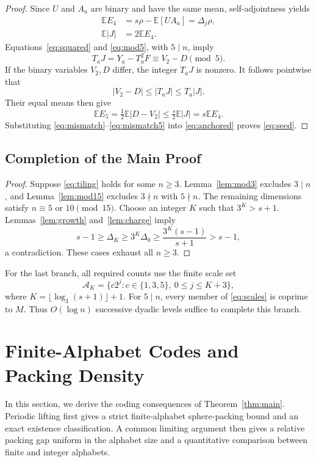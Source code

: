 \documentclass[12pt,letterpaper,onecolumn]{article}
\theoremstyle{definition}
\newcommand{\E}{\mathbb{E}}
\begin{document}
\begin{proof}
Since $U$ and $A_a$ are binary and have the same mean, self-adjointness yields
\begin{align}\label{eq:mismatch}
 \E E_4&=s\rho-\E[UA_a]=\Delta_j\rho,\nonumber\\
 \E|J|&=2\E E_4.
\end{align}
Equations~\eqref{eq:squared} and \eqref{eq:mod5}, with $5\mid n$, imply
\[
 T_aJ=Y_a-T_a^2F\equiv V_2-D\pmod5.
\]
If the binary variables $V_2,D$ differ, the integer $T_aJ$ is nonzero. It follows pointwise that
\[
 |V_2-D|\le|T_aJ|\le T_a|J|.
\]
Their equal means then give
\begin{equation}\label{eq:mismatch5}
 \E E_5=\tfrac12\E|D-V_2|
 \le\tfrac{s}{2}\E|J|=s\E E_4.
\end{equation}
Substituting \eqref{eq:mismatch}--\eqref{eq:mismatch5} into \eqref{eq:anchored} proves \eqref{eq:seed}.
\end{proof}

\subsection{Completion of the Main Proof}
\begin{proof}
Suppose \eqref{eq:tiling} holds for some $n\ge3$. Lemma~\ref{lem:mod3} excludes $3\mid n$, and Lemma~\ref{lem:mod15} excludes $3\nmid n$ with $5\nmid n$. The remaining dimensions satisfy $n\equiv5$ or $10\pmod{15}$. Choose an integer $K$ such that $3^K>s+1$. Lemmas~\ref{lem:growth} and~\ref{lem:charge} imply
\begin{equation}\label{eq:final-contradiction}
 s-1\ge\Delta_K\ge3^K\Delta_0
 \ge\frac{3^K(s-1)}{s+1}>s-1,
\end{equation}
a contradiction. These cases exhaust all $n\ge3$.
\end{proof}

For the last branch, all required counts use the finite scale set
\begin{equation}\label{eq:scales}
 \mathcal A_K=\{c2^j:c\in\{1,3,5\},\ 0\le j\le K+3\},
\end{equation}
where $K=\lfloor\log_3(s+1)\rfloor+1$. For $5\mid n$, every member of \eqref{eq:scales} is coprime to $M$. Thus $O(\log n)$ successive dyadic levels suffice to complete this branch.

 \section{Finite-Alphabet Codes and Packing Density}\label{sec:coding}
In this section, we derive the coding consequences of Theorem~\ref{thm:main}. Periodic lifting first gives a strict finite-alphabet sphere-packing bound and an exact existence classification. A common limiting argument then gives a relative packing gap uniform in the alphabet size and a quantitative comparison between finite and integer alphabets.
\end{document}
